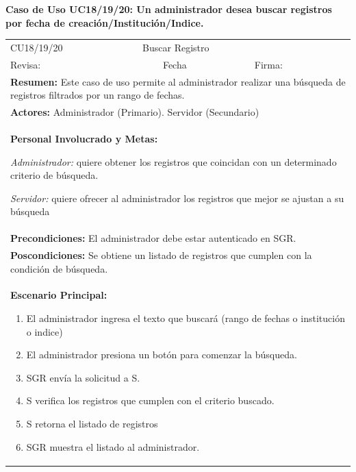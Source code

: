 		\textbf{Caso de Uso UC18/19/20: Un administrador desea buscar registros por fecha de creación/Institución/Indice.}
			\begin{longtable}{|l|p{5.5cm}|l|p{2cm}|l|p{1.9cm}|} \hline
					\cellcolor{grisOscuro} CU18/19/20 & \multicolumn{4}{|l|}{  \cellcolor{grisOscuro} Buscar Registro} &  \cellcolor{grisClaro}\multirow{2}{1cm}{} \\ \cline{1-5}
					\cellcolor{grisOscuro} Revisa: &  \cellcolor{grisClaro} &  \cellcolor{grisOscuro} Fecha &  \cellcolor{grisClaro} &  \cellcolor{grisOscuro} Firma: & \cellcolor{grisClaro} \\ \hline
					\multicolumn{6}{|p{15cm}|}{ \textbf{Resumen: } Este caso de uso permite al administrador realizar una búsqueda de registros filtrados por un rango de fechas.

					} \\ \hline

					\multicolumn{6}{|p{15cm}|}{ \textbf{Actores: } Administrador (Primario). Servidor (Secundario)

					} \\ \hline

					\multicolumn{6}{|p{15cm}|}{ \textbf{Personal Involucrado y Metas: }
					
					\emph{Administrador:} quiere obtener los registros que coincidan con un determinado criterio de búsqueda.

					\emph{Servidor:} quiere ofrecer al administrador los registros que mejor se ajustan a su búsqueda

					} \\ \hline

					\multicolumn{6}{|p{15cm}|}{ \textbf{Precondiciones: } El administrador debe estar autenticado en SGR.

					} \\ \hline

					\multicolumn{6}{|p{15cm}|}{ \textbf{Poscondiciones: } Se obtiene un listado de registros que cumplen con la condición de búsqueda.

					} \\ \hline

					\multicolumn{6}{|p{15cm}|}{ \textbf{Escenario Principal: }

					\begin{enumerate}
							\item El administrador ingresa el texto que buscará (rango de fechas o institución o indice)
							\item El administrador presiona un botón para comenzar la búsqueda.
							\item SGR envía la solicitud a S.
							\item S verifica los registros que cumplen con el criterio buscado.
							\item S retorna el listado de registros
							\item SGR muestra el listado al administrador.
					\end{enumerate}

}
\end{longtable}
